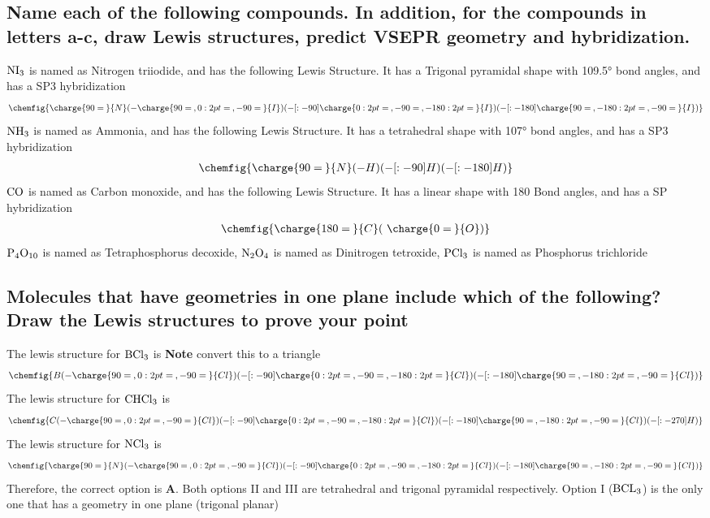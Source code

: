 \documentclass[11pt]{article}
\begin{document}
\subsection{Name each of the following compounds. In addition, for the compounds in letters a-c, draw Lewis structures, predict VSEPR geometry and hybridization.}
\label{sec:orgb31d9c5}
\(\ce{NI3}\) is named as Nitrogen triiodide, and has the following Lewis Structure. It has a Trigonal pyramidal shape with 109.5° bond angles, and has a SP3 hybridization
\begin{align}
\chemfig{\charge{90=\:}{N}(-\charge{90=\:, 0:2pt=\:, -90=\:}{I})(-[:-90]\charge{0:2pt=\:, -90=\:, -180:2pt=\:}{I})(-[:-180]\charge{90=\:, -180:2pt=\:, -90=\:}{I})}
\end{align}
\(\ce{NH3}\) is named as Ammonia, and has the following Lewis Structure. It has a tetrahedral shape with 107° bond angles, and has a SP3 hybridization
\begin{align}
\chemfig{\charge{90=\:}{N}(-{H})(-[:-90]{H})(-[:-180]{H})}
\end{align}
\(\ce{CO}\) is named as Carbon monoxide, and has the following Lewis Structure. It has a linear shape with 180\textdegree{} Bond angles, and has a SP hybridization
\begin{align}
\chemfig{\charge{180=\:}{C}(~\charge{0=\:}{O})}
\end{align}
\(\ce{P4O10}\) is named as Tetraphosphorus decoxide,
\(\ce{N2O4}\) is named as Dinitrogen tetroxide,
\(\ce{PCl3}\) is named as Phosphorus trichloride

\subsection{Molecules that have geometries in one plane include which of the following? Draw the Lewis structures to prove your point}
\label{sec:org71c8c4b}
The lewis structure for \(\ce{BCl3}\) is \textbf{Note} convert this to a triangle
\begin{align}
\chemfig{{B}(-\charge{90=\:, 0:2pt=\:, -90=\:}{Cl})(-[:-90]\charge{0:2pt=\:, -90=\:, -180:2pt=\:}{Cl})(-[:-180]\charge{90=\:, -180:2pt=\:, -90=\:}{Cl})}
\end{align}
The lewis structure for \(\ce{CHCl3}\) is
\begin{align}
\chemfig{{C}(-\charge{90=\:, 0:2pt=\:, -90=\:}{Cl})(-[:-90]\charge{0:2pt=\:, -90=\:, -180:2pt=\:}{Cl})(-[:-180]\charge{90=\:, -180:2pt=\:, -90=\:}{Cl})(-[:-270]{H})}
\end{align}
The lewis structure for \(\ce{NCl3}\) is
\begin{align}
\chemfig{\charge{90=\:}{N}(-\charge{90=\:, 0:2pt=\:, -90=\:}{Cl})(-[:-90]\charge{0:2pt=\:, -90=\:, -180:2pt=\:}{Cl})(-[:-180]\charge{90=\:, -180:2pt=\:, -90=\:}{Cl})}
\end{align}
Therefore, the correct option is \textbf{A}. Both options II and III are tetrahedral and trigonal pyramidal respectively. Option I (\(\ce{BCL3}\)) is the only one that has a geometry in one plane (trigonal planar)
\end{document}
